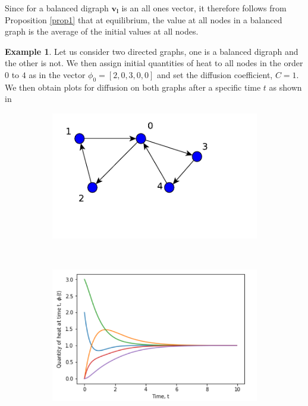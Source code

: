\documentclass[10pt,a4paper]{article}
\theoremstyle{plain}
\theoremstyle{definition}
\newtheorem{exa}[subsection]{Example}
\begin{document}
      Since for a balanced digraph $\mathbf{v_l}$ is an all ones vector, it therefore follows from Proposition \ref{prop1} that at equilibrium, the value at all nodes in a balanced graph is the average of the initial values at all nodes.
      
      \begin{exa}
      	Let us consider two directed graphs, one is a balanced digraph and the other is not. We then assign initial quantities of heat to all nodes in the order $0$ to $4$ as in the vector $\phi_0=[2,0,3,0,0]$ and set the diffusion coefficient, $C=1$. We then obtain plots for diffusion on both graphs after a specific time $t$ as shown in 
      	
      	\begin{figure}[H]
      		\centering
      	    \begin{subfigure}[b]{0.40\textwidth}
      	    	\includegraphics[width=\textwidth]{images/balanceDigraph.pdf}
      	    	\caption{}
      	    	\label{balanced-graph}
      	    \end{subfigure}~
      	    \begin{subfigure}[b]{0.5\textwidth}
      	    	\includegraphics[width= \textwidth]{images/Balanced-digraph-diffusion.png}

\end{subfigure}
\end{figure}
\end{exa}
\end{document}
